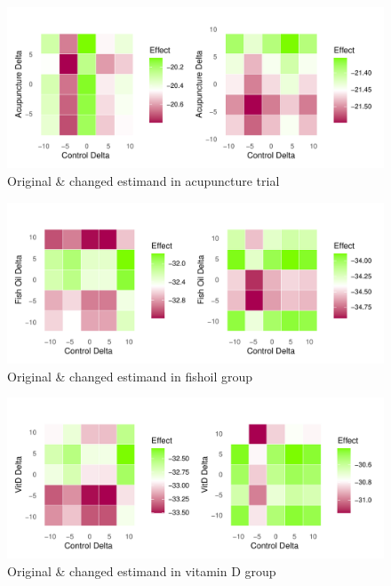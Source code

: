 \documentclass{article}
\newcommand{\pandocbounded}[1]{#1}
\begin{document}
\begin{figure}
\centering
\pandocbounded{\includegraphics[keepaspectratio]{Final_Report_files/figure-latex/unnamed-chunk-35-1.pdf}}
\caption{Original \& changed estimand in acupuncture trial}
\end{figure}

\begin{figure}
\centering
\pandocbounded{\includegraphics[keepaspectratio]{Final_Report_files/figure-latex/unnamed-chunk-36-1.pdf}}
\caption{Original \& changed estimand in fishoil group}
\end{figure}

\begin{figure}
\centering
\pandocbounded{\includegraphics[keepaspectratio]{Final_Report_files/figure-latex/unnamed-chunk-37-1.pdf}}
\caption{Original \& changed estimand in vitamin D group}
\end{figure}
\end{document}
